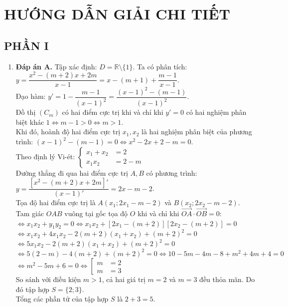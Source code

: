 \documentclass[12pt,a4paper]{article}
\begin{document}
\newpage
\section*{HƯỚNG DẪN GIẢI CHI TIẾT}

\subsection*{PHẦN I}
\begin{enumerate}[label=\textbf{Câu \arabic*:}, leftmargin=*]
\item \textbf{Đáp án A.} Tập xác định: $D = \mathbb{R} \setminus \{1\}$. Ta có phân tích:
$y = \dfrac{x^2 - (m+2)x + 2m}{x - 1} = x - (m + 1) + \dfrac{m - 1}{x - 1}$.\\
Đạo hàm: $y' = 1 - \dfrac{m - 1}{(x - 1)^2} = \dfrac{(x - 1)^2 - (m - 1)}{(x - 1)^2}$.\\
Đồ thị $(C_m)$ có hai điểm cực trị khi và chỉ khi $y' = 0$ có hai nghiệm phân biệt khác $1 \iff m - 1 > 0 \iff m > 1$.\\
Khi đó, hoành độ hai điểm cực trị $x_1, x_2$ là hai nghiệm phân biệt của phương trình:
$(x - 1)^2 - (m - 1) = 0 \iff x^2 - 2x + 2 - m = 0$.\\
Theo định lý Vi-ét: $\left\{\begin{aligned} x_1 + x_2 &= 2 \\ x_1 x_2 &= 2 - m \end{aligned}\right.$\\
Đường thẳng đi qua hai điểm cực trị $A, B$ có phương trình:
$y = \dfrac{[x^2 - (m+2)x + 2m]'}{(x - 1)'} = 2x - m - 2$.\\
Tọa độ hai điểm cực trị là $A(x_1; 2x_1 - m - 2)$ và $B(x_2; 2x_2 - m - 2)$.\\
Tam giác $OAB$ vuông tại gốc tọa độ $O$ khi và chỉ khi $\overrightarrow{OA} \cdot \overrightarrow{OB} = 0$:\\
$\iff x_1 x_2 + y_1 y_2 = 0 \iff x_1 x_2 + [2x_1 - (m + 2)][2x_2 - (m + 2)] = 0$\\
$\iff x_1 x_2 + 4x_1 x_2 - 2(m + 2)(x_1 + x_2) + (m + 2)^2 = 0$\\
$\iff 5x_1 x_2 - 2(m + 2)(x_1 + x_2) + (m + 2)^2 = 0$\\
$\iff 5(2 - m) - 4(m + 2) + (m + 2)^2 = 0 \iff 10 - 5m - 4m - 8 + m^2 + 4m + 4 = 0$\\
$\iff m^2 - 5m + 6 = 0 \iff \left[\begin{aligned} m &= 2 \\ m &= 3 \end{aligned}\right.$\\
So sánh với điều kiện $m > 1$, cả hai giá trị $m = 2$ và $m = 3$ đều thỏa mãn. Do đó tập hợp $S = \{2; 3\}$.\\
Tổng các phần tử của tập hợp $S$ là $2 + 3 = 5$.


\end{enumerate}
\end{document}
